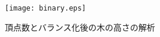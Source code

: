 
\begin{figure}[tb]
  \centering
  \texttt{[image: binary.eps]}
  \caption{頂点数とバランス化後の木の高さの解析}\label{fig:binary}
\end{figure}



